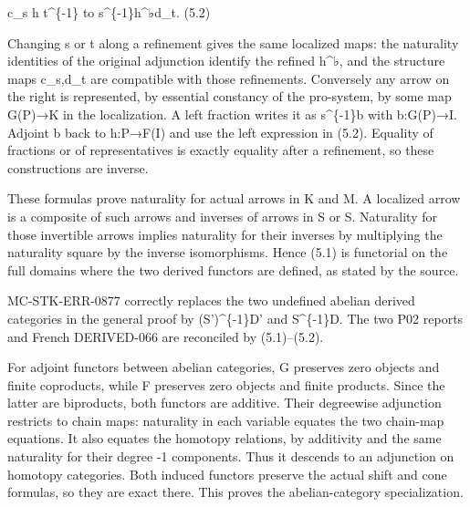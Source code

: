 c\_\allowbreak{}s h t\^{}\{-1\} to s\textasciicircum{}\{-1\}h\textasciicircum{}{\Rsixtyonesymbolfont ♭}d\_\allowbreak{}t. (5.2)\allowbreak{}

Changing s or t along a refinement gives the same localized maps:\allowbreak{} the naturality identities of the original adjunction identify the refined h\textasciicircum{}{\Rsixtyonesymbolfont ♭},\allowbreak{} and the structure maps c\_\allowbreak{}s,\allowbreak{}d\_\allowbreak{}t are compatible with those refinements. Conversely any arrow on the right is represented,\allowbreak{} by essential constancy of the pro-system,\allowbreak{} by some map G(P)\allowbreak{}\allowbreak{}→K in the localization. A left fraction writes it as s\^{}\{-1\}b with b:\allowbreak{}G(P)\allowbreak{}\allowbreak{}→I. Adjoint b back to h:\allowbreak{}P\allowbreak{}→F(I)\allowbreak{} and use the left expression in (5.2)\allowbreak{}. Equality of fractions or of representatives is exactly equality after a refinement,\allowbreak{} so these constructions are inverse.

These formulas prove naturality for actual arrows in K and M. A localized arrow is a composite of such arrows and inverses of arrows in S or S\textquotesingle. Naturality for those invertible arrows implies naturality for their inverses by multiplying the naturality square by the inverse isomorphisms. Hence (5.1)\allowbreak{} is functorial on the full domains where the two derived functors are defined,\allowbreak{} as stated by the source.

MC-STK-ERR-0877 correctly replaces the two undefined abelian derived categories in the general proof by (S')\allowbreak{}\textasciicircum{}\{-1\}D' and S\^{}\{-1\}D. The two P02 reports and French DERIVED-066 are reconciled by (5.1)\allowbreak{}–\allowbreak{}(5.2)\allowbreak{}.

For adjoint functors between abelian categories,\allowbreak{} G preserves zero objects and finite coproducts,\allowbreak{} while F preserves zero objects and finite products. Since the latter are biproducts,\allowbreak{} both functors are additive. Their degreewise adjunction restricts to chain maps:\allowbreak{} naturality in each variable equates the two chain-map equations. It also equates the homotopy relations,\allowbreak{} by additivity and the same naturality for their degree -1 components. Thus it descends to an adjunction on homotopy categories. Both induced functors preserve the actual shift and cone formulas,\allowbreak{} so they are exact there. This proves the abelian-category specialization.

